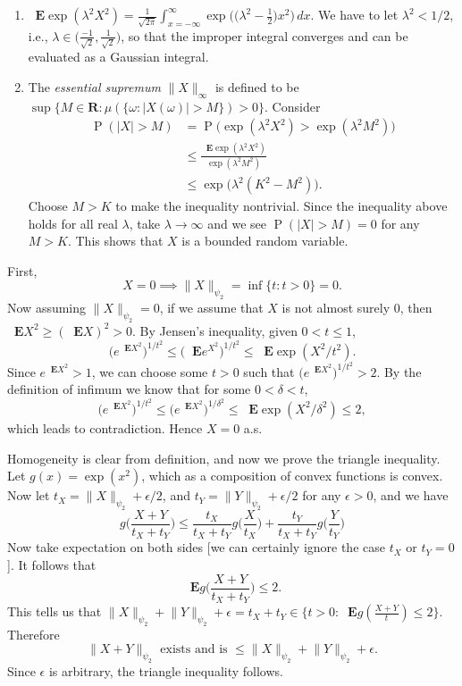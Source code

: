 \documentclass[11pt]{article}
\newcommand{\R}{\mathbf{R}}
\newcommand{\nm}[1]{\lVert #1 \rVert}
\newcommand{\abs}[1]{\lvert #1 \rvert}
\renewcommand{\Pr}{\operatorname{P}}
\newcommand{\E}{\mathop{}\!\mathbf{E}}
\newcommand{\df}[1]{\textit{\textsf{#1}}} %
\theoremstyle{plain}
\theoremstyle{definition}
\theoremstyle{remark}
\theoremstyle{definition}
\newenvironment{mansol}[1]{%
  \renewcommand\themansolinner{#1}%
  \mansolinner
}{\endmansolinner}
\begin{document}
\begin{mansol}{2.5.5}
    \begin{enumerate}[label=(\alph*)]
        \item $\E \exp(\lambda^2 X^2) = \frac{1}{\sqrt{2\pi}}\int_{x = -\infty}^\infty \exp\bigl(\bigl(\lambda^2 -\frac 1 2\bigr) x^2\bigr)\,dx$. We have to let $\lambda^2 < 1/2$, i.e., $\lambda \in \bigl(\frac{-1}{\sqrt{2}}, \frac{1}{\sqrt{2}}\bigr)$, so that the improper integral converges and can be evaluated as a Gaussian integral.
        \item The \df{essential supremum} $\nm{X}_\infty$ is defined to be $\sup\{M \in \R : \mu(\{\omega : \abs{X(\omega)} > M\}) > 0\}$. Consider \begin{align*}
            \Pr (\abs{X} > M) & = \Pr\bigl(\exp(\lambda^2 X^2) > \exp(\lambda^2 M^2)\bigr) \\
            & \leq \frac{\E \exp(\lambda^2 X^2)}{\exp(\lambda^2 M^2)} \\
            & \leq \exp\bigl(\lambda^2(K^2 - M^2)\bigr).
        \end{align*}
        Choose $M > K$ to make the inequality nontrivial. Since the inequality above holds for all real $\lambda$, take $\lambda \to \infty$ and we see $\Pr(\abs{X} > M) = 0$ for any $M > K$. This shows that $X$ is a bounded random variable.
    \end{enumerate}
\end{mansol}

\begin{mansol}{2.5.7}
    First, \[X = 0 \implies \nm{X}_{\psi_2} = \inf\{t:t>0\} = 0.\] Now assuming $\nm{X}_{\psi_2} = 0$, if we assume that $X$ is not almost surely 0, then $\E X^2 \geq (\E X)^2 > 0$. By Jensen's inequality, given $0<t\leq 1$, \[
    \bigl(e^{\E X^2}\bigr)^{1/t^2} \leq \bigl(\E e^{X^2}\bigr)^{1/t^2} \leq \E \exp(X^2 / t^2).
    \]
    Since $e^{\E X^2} > 1$, we can choose some $t > 0$ such that $\bigl(e^{\E X^2}\bigr)^{1/t^2} > 2$. By the definition of infimum we know that for some $0 < \delta < t$, \[
         \bigl(e^{\E X^2}\bigr)^{1/t^2} \leq \bigl(e^{\E X^2}\bigr)^{1/\delta^2} \leq \E \exp(X^2 / \delta^2) \leq 2,
    \]
    which leads to contradiction. Hence $X = 0$ a.s.

    Homogeneity is clear from definition, and now we prove the triangle inequality. Let $g(x) = \exp(x^2)$, which as a composition of convex functions is convex. Now let $t_X = \nm{X}_{\psi_2} + \epsilon/2$, and $t_Y = \nm{Y}_{\psi_2} + \epsilon/2$ for any $\epsilon > 0$, and we have \[
        g \biggl(\frac{X+Y}{t_X + t_Y}\biggr) \leq \frac{t_X}{t_X + t_Y} g\biggl(\frac{X}{t_X}\biggr) + \frac{t_Y}{t_X + t_Y} g\biggl(\frac{Y}{t_Y}\biggr)
    \]
    Now take expectation on both sides [we can certainly ignore the case $t_X$ or $t_Y = 0$]. It follows that \[\E g \biggl(\frac{X+Y}{t_X + t_Y}\biggr) \leq 2.\]
    This tells us that $\nm{X}_{\psi_2} + \nm{Y}_{\psi_2} + \epsilon = t_X + t_Y \in \{t>0 : \E g(\frac{X+Y}{t}) \leq 2\}$. Therefore \[
        \nm{X+Y}_{\psi_2} \text{ exists and is } \leq \nm{X}_{\psi_2} + \nm{Y}_{\psi_2} + \epsilon.
    \]
    Since $\epsilon$ is arbitrary, the triangle inequality follows.
\end{mansol}
\end{document}
